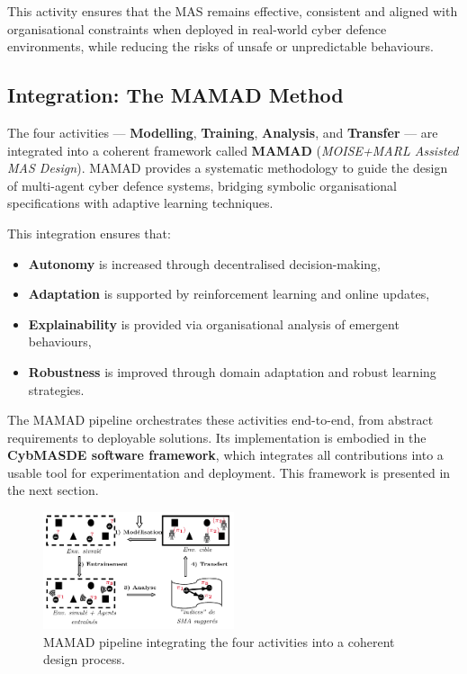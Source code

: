 \documentclass[a4paper,10pt,twocolumn]{article}
\begin{document}
This activity ensures that the MAS remains effective, consistent and
aligned with organisational constraints when deployed in real-world
cyber defence environments, while reducing the risks of unsafe or
unpredictable behaviours.


\subsection*{Integration: The MAMAD Method}

The four activities --- \textbf{Modelling}, \textbf{Training},
\textbf{Analysis}, and \textbf{Transfer} --- are integrated into a
coherent framework called \textbf{MAMAD}
(\textit{MOISE+MARL Assisted MAS Design}). MAMAD provides a systematic
methodology to guide the design of multi-agent cyber defence systems,
bridging symbolic organisational specifications with adaptive learning
techniques.

This integration ensures that:
\begin{itemize}
    \item \textbf{Autonomy} is increased through decentralised decision-making,
    \item \textbf{Adaptation} is supported by reinforcement learning and
          online updates,
    \item \textbf{Explainability} is provided via organisational analysis of
          emergent behaviours,
    \item \textbf{Robustness} is improved through domain adaptation and
          robust learning strategies.
\end{itemize}

The MAMAD pipeline orchestrates these activities end-to-end, from
abstract requirements to deployable solutions. Its implementation is
embodied in the \textbf{CybMASDE software framework}, which integrates
all contributions into a usable tool for experimentation and
deployment. This framework is presented in the next section.

\begin{figure}[h!]
    \centering
    \includegraphics[width=0.5\textwidth]{figures/cycle.pdf}
    \caption{MAMAD pipeline integrating the four activities into a coherent design process.}
    \label{fig:cycle}
\end{figure}
\end{document}
